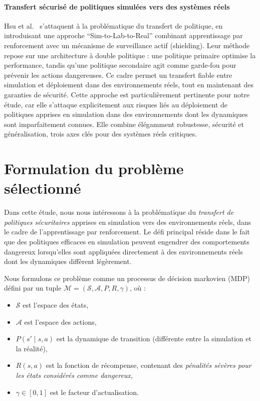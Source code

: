 \documentclass{article}
\begin{document}
\paragraph{Transfert sécurisé de politiques simulées vers des systèmes réels}
Hsu et al.~\cite{hsu2022sim2real} s’attaquent à la problématique du transfert de politique, en introduisant une approche ``Sim-to-Lab-to-Real'' combinant apprentissage par renforcement avec un mécanisme de surveillance actif (shielding). Leur méthode repose sur une architecture à double politique : une politique primaire optimise la performance, tandis qu’une politique secondaire agit comme garde-fou pour prévenir les actions dangereuses. Ce cadre permet un transfert fiable entre simulation et déploiement dans des environnements réels, tout en maintenant des garanties de sécurité. Cette approche est particulièrement pertinente pour notre étude, car elle s’attaque explicitement aux risques liés au déploiement de politiques apprises en simulation dans des environnements dont les dynamiques sont imparfaitement connues. Elle combine élégamment robustesse, sécurité et généralisation, trois axes clés pour des systèmes réels critiques.

\section*{Formulation du problème sélectionné}

Dans cette étude, nous nous intéressons à la problématique du \textit{transfert de politiques sécuritaires} apprises en simulation vers des environnements réels, dans le cadre de l’apprentissage par renforcement. Le défi principal réside dans le fait que des politiques efficaces en simulation peuvent engendrer des comportements dangereux lorsqu’elles sont appliquées directement à des environnements réels dont les dynamiques diffèrent légèrement.

Nous formulons ce problème comme un processus de décision markovien (MDP) défini par un tuple $\mathcal{M} = (\mathcal{S}, \mathcal{A}, P, R, \gamma)$, où :
\begin{itemize}
    \item $\mathcal{S}$ est l’espace des états,
    \item $\mathcal{A}$ est l’espace des actions,
    \item $P(s' \mid s, a)$ est la dynamique de transition (différente entre la simulation et la réalité),
    \item $R(s, a)$ est la fonction de récompense, contenant des \textit{pénalités sévères pour les états considérés comme dangereux},
    \item $\gamma \in [0,1]$ est le facteur d’actualisation.
\end{itemize}
\end{document}
